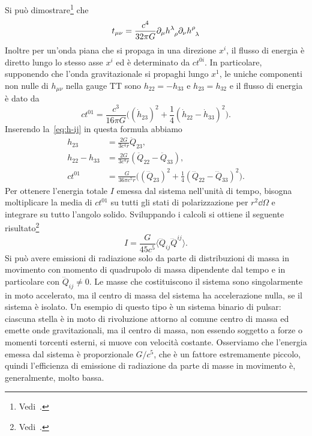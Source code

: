 Si può dimostrare\footnote{Vedi~\textcite[449]{landau:campi}.} che
\begin{equation}
  t_{\mu\nu} = \frac{c^{4}}{32\pi G} \partial_{\mu}
  \tensor{h}{^{\lambda}_{\rho}} \partial_{\nu} \tensor{h}{^{\rho}_{\lambda}}
\end{equation}
Inoltre per un'onda piana che si propaga in una direzione $x^{i}$, il flusso di
energia è diretto lungo lo stesso asse $x^{i}$ ed è determinato da $ct^{0i}$.
In particolare, supponendo che l'onda gravitazionale si propaghi lungo $x^{1}$,
le uniche componenti non nulle di $h_{\mu\nu}$ nella gauge TT sono
$h_{22} = -h_{33}$ e $h_{23} = h_{32}$ e il flusso di energia è dato da
\begin{equation}
  ct^{01} = \frac{c^{3}}{16\pi G}\bigg((\dot{h}_{23})^{2} +
  \frac{1}{4}(\dot{h}_{22} - \dot{h}_{33})^{2}\bigg).
\end{equation}
Inserendo la~\eqref{eq:h-ij} in questa formula abbiamo
\begin{subequations}
  \begin{align}
    h_{23} &= \frac{2G}{3c^{4}r} \ddot{Q}_{23}, \\
    h_{22} - h_{33} &= \frac{2G}{3c^{4}r}(\ddot{Q}_{22} - \ddot{Q}_{33}), \\
    ct^{01} &= \frac{G}{36\pi c^{5}r}\bigg((\dddot{Q}_{23})^{2} +
    \frac{1}{4}(\dddot{Q}_{22} - \dddot{Q}_{33})^{2}\bigg).
  \end{align}
\end{subequations}
Per ottenere l'energia totale $I$ emessa dal sistema nell'unità di tempo,
bisogna moltiplicare la media di $ct^{01}$ su tutti gli stati di polarizzazione
per $r^{2}\dd\Omega$ e integrare su tutto l'angolo solido.  Sviluppando i
calcoli si ottiene il seguente
risultato\footnote{Vedi~\textcite[460-461]{landau:campi}.}
\begin{equation}
  I = \frac{G}{45c^{5}} \langle \dddot{Q}_{ij} \dddot{Q}^{ij}\rangle.
\end{equation}
Si può avere emissioni di radiazione solo da parte di distribuzioni di massa in
movimento con momento di quadrupolo di massa dipendente dal tempo e in
particolare con $\dddot{Q}_{ij} \neq 0$.  Le masse che costituiscono il sistema
sono singolarmente in moto accelerato, ma il centro di massa del sistema ha
accelerazione nulla, se il sistema è isolato.  Un esempio di questo tipo è un
sistema binario di pulsar: ciascuna stella è in moto di rivoluzione attorno al
comune centro di massa ed emette onde gravitazionali, ma il centro di massa, non
essendo soggetto a forze o momenti torcenti esterni, si muove con velocità
costante.  Osserviamo che l'energia emessa dal sistema è proporzionale
$G/c^{5}$, che è un fattore estremamente piccolo, quindi l'efficienza di
emissione di radiazione da parte di masse in movimento è, generalmente, molto
bassa.

